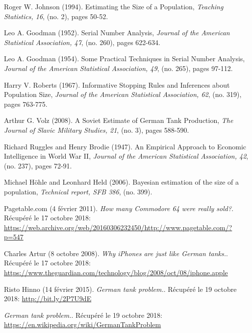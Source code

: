 \bigskip


\begin{thebibliography}{10}

 Roger W. Johnson (1994). Estimating the Size of a Population, {\em Teaching Statistics, 16}, (no. 2), pages 50-52.

 Leo A. Goodman (1952). Serial Number Analysis, {\em Journal of the American Statistical Association, 47}, (no. 260), pages 622-634.

 Leo A. Goodman (1954). Some Practical Techniques in Serial Number Analysis, {\em Journal of the American Statistical Association, 49}, (no. 265), pages 97-112.

 Harry V. Roberts (1967). Informative Stopping Rules and Inferences about Population Size, {\em Journal of the American Statistical Association, 62}, (no. 319), pages 763-775.

 Arthur G. Volz (2008). A Soviet Estimate of German Tank Production, {\em The Journal of Slavic Military Studies, 21}, (no. 3), pages 588-590.

 Richard Ruggles and Henry Brodie (1947). An Empirical Approach to Economic Intelligence in World War II, {\em Journal of the American Statistical Association, 42}, (no. 237), pages 72-91.

 Michael Höhle and Leonhard Held (2006). Bayesian estimation of the size of a population, {\em Technical report, SFB 386}, (no. 399).

 Pagetable.com (4 février 2011). {\em How many Commodore 64 were really sold?}. Récupéré le 17 octobre 2018:  \href{https://web.archive.org/web/20160306232450/http://www.pagetable.com/?p=547}{https://web.archive.org/web/20160306232450/http://www.pagetable.com/?p=547}

 Charles Artur (8 octobre 2008). {\em Why iPhones are just like German tanks.}. Récupéré le 17 octobre 2018: \href{https://www.theguardian.com/technology/blog/2008/oct/08/iphone.apple}{https://www.theguardian.com/technology/blog/2008/oct/08/iphone.apple}

 Risto Hinno (14 février 2015). {\em German tank problem.}. Récupéré le 19 octobre 2018:  \href{http://bit.ly/2P7U9dE}{http://bit.ly/2P7U9dE}

 {\em German tank problem.}. Récupéré le 19 octobre 2018:  \href{https://en.wikipedia.org/wiki/German_tank_problem}{https://en.wikipedia.org/wiki/GermanTankProblem}

\end{thebibliography}
